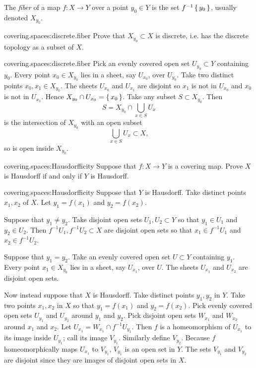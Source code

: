 The \emph{fiber} of a map \(f \colon X \to Y\) over a point \(y_0 \in Y\) is the set \(f^{-1}\set{y_0}\), usually denoted \(X_{y_0}\).
\begin{problem}{covering.spaces:discrete.fiber}
Prove that \(X_{y_0} \subset X\) is discrete, i.e. has the discrete topology as a subset of \(X\).
\end{problem}
\begin{answer}{covering.spaces:discrete.fiber}
Pick an evenly covered open set \(U_{y_0} \subset Y\) containing \(y_0\).
Every point \(x_0 \in X_{y_0}\) lies in a sheet, say \(U_{x_0}\), over \(U_{y_0}\).
Take two distinct points \(x_0, x_1 \in X_{y_0}\).
The sheets \(U_{x_0}\) and \(U_{x_1}\) are disjoint so \(x_1\) is not in \(U_{x_0}\) and \(x_0\) is not in \(U_{x_1}\).
Hence \(X_{y_0} \cap U_{x_0} = \set{x_0}\).
Take any subset \(S \subset X_{y_0}\).
Then 
\[
S = X_{y_0} \cap \bigcup_{x \in S} U_{x} 
\]
is the intersection of \(X_{y_0}\) with an open subset 
\[
\bigcup_{x \in S} U_{x} \subset X,
\]
so is open inside \(X_{y_0}\).
\end{answer}
\begin{problem}{covering.spaces:Hausdorfficity}
Suppose that \(f \colon X \to Y\) is a covering map.
Prove \(X\) is Hausdorff if and only if \(Y\) is Hausdorff.
\end{problem}
\begin{answer}{covering.spaces:Hausdorfficity}
Suppose that \(Y\) is Hausdorff. 
Take distinct points \(x_1, x_2\) of \(X\).
Let \(y_1=f(x_1)\) and \(y_2=f(x_2)\).

Suppose that \(y_1 \ne y_2\).
Take disjoint open sets \(U_1, U_2 \subset Y\) so that \(y_1 \in U_1\) and \(y_2 \in U_2\).
Then \(f^{-1}U_1, f^{-1}U_2 \subset X\) are disjoint open sets so that \(x_1 \in f^{-1}U_1\) and \(x_2 \in f^{-1}U_2\).

Suppose that \(y_1 = y_2\).
Take an evenly covered open set \(U \subset Y\) containing \(y_1\).
Every point \(x_1 \in X_{y_0}\) lies in a sheet, say \(U_{x_1}\), over \(U\).
The sheets \(U_{x_1}\) and \(U_{x_2}\) are disjoint open sets.

Now instead suppose that \(X\) is Hausdorff.
Take distinct points \(y_1, y_2\) in \(Y\).
Take two points \(x_1, x_2\) in \(X\) so that \(y_1=f(x_1)\) and \(y_2=f(x_2)\).
Pick evenly covered open sets \(U_{y_1}\) and \(U_{y_2}\) around \(y_1\) and \(y_2\).
Pick disjoint open sets \(W_{x_1}\) and \(W_{x_2}\) around \(x_1\) and \(x_2\).
Let \(U_{x_1}=W_{x_1} \cap f^{-1} U_{y_1}\).
Then \(f\) is a homeomorphism of \(U_{x_1}\) to its image inside \(U_{y_1}\); call its image \(V_{y_1}\).
Similarly define \(V_{y_2}\).
Because \(f\) homeomorphically maps \(U_{x_1}\) to \(V_{y_1}\), \(V_{y_1}\) is an open set in \(Y\).
The sets \(V_{y_1}\) and \(V_{y_2}\) are disjoint since they are images of disjoint open sets in \(X\).
\end{answer}
